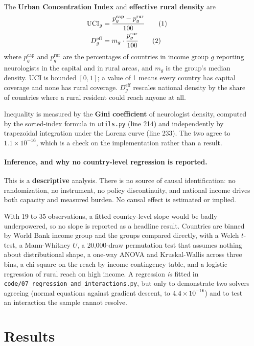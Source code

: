 \documentclass[10pt]{article}
\newcommand{\numberthis}{\refstepcounter{equation}\tag{\theequation}}
\begin{document}
The \textbf{Urban Concentration Index} and \textbf{effective rural density} are
%
\begin{align*}
\mathrm{UCI}_g &= \frac{p^{\text{cap}}_g - p^{\text{rur}}_g}{100} \numberthis \label{eqn:uci} \\
D^{\text{eff}}_g &= m_g \cdot \frac{p^{\text{rur}}_g}{100} \numberthis \label{eqn:erd}
\end{align*}
%
where $p^{\text{cap}}_g$ and $p^{\text{rur}}_g$ are the percentages of countries
in income group $g$ reporting neurologists in the capital and in rural areas,
and $m_g$ is the group's median density. UCI is bounded $[0,1]$; a value of 1
means every country has capital coverage and none has rural coverage.
$D^{\text{eff}}_g$ rescales national density by the share of countries where a
rural resident could reach anyone at all.

Inequality is measured by the \textbf{Gini coefficient} of neurologist density,
computed by the sorted-index formula in \texttt{utils.py} (line 214) and
independently by trapezoidal integration under the Lorenz curve (line 233). The
two agree to $1.1\times10^{-16}$, which is a check on the implementation rather
than a result.

\paragraph{Inference, and why no country-level regression is reported.} This is
a \textbf{descriptive} analysis. There is no source of causal identification: no
randomization, no instrument, no policy discontinuity, and national income drives
both capacity and measured burden. No causal effect is estimated or implied.

With 19 to 35 observations, a fitted country-level slope would be badly
underpowered, so no slope is reported as a headline result. Countries are binned
by World Bank income group and the groups compared directly, with a Welch
$t$-test, a Mann-Whitney $U$, a 20{,}000-draw permutation test that assumes
nothing about distributional shape, a one-way ANOVA and Kruskal-Wallis across
three bins, a chi-square on the reach-by-income contingency table, and a
logistic regression of rural reach on high income. A regression \emph{is} fitted
in \texttt{code/07\_regression\_and\_interactions.py}, but only to demonstrate
two solvers agreeing (normal equations against gradient descent, to
$4.4\times10^{-16}$) and to test an interaction the sample cannot resolve.

\section*{Results}
\end{document}
